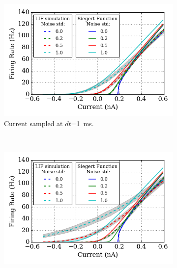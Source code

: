	\begin{figure}[tbp!]
		\centering
		\DIFdelbeginFL %
\DIFdelendFL \DIFaddbeginFL \begin{subfigure}[t]{0.7\textwidth}
			\includegraphics[width=\textwidth]{pics_iconip/revise_2-1.png}
			\DIFaddendFL \caption{Current sampled at $dt$=1~ms.}
		\end{subfigure}\DIFdelbeginFL %
\DIFdelendFL \DIFaddbeginFL \\
		\begin{subfigure}[t]{0.7\textwidth}
			\includegraphics[width=\textwidth]{pics_iconip/revise_2-2.png}

\end{subfigure}
\end{figure}

